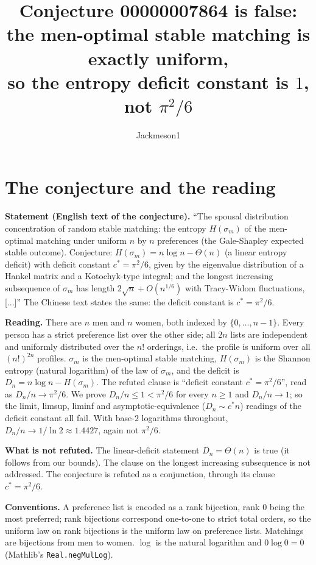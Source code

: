 \documentclass[11pt]{article}
\title{Conjecture 00000007864 is false:\\ the men-optimal stable matching is exactly uniform,\\ so the entropy deficit constant is $1$, not $\pi^2/6$}
\author{Jackmeson1}
\date{}
\theoremstyle{definition}
\begin{document}
\maketitle

\section{The conjecture and the reading}

\textbf{Statement (English text of the conjecture).} ``The spousal distribution concentration of random stable
matching: the entropy $H(\sigma_m)$ of the men-optimal matching under uniform $n$ by $n$ preferences (the
Gale-Shapley expected stable outcome). Conjecture: $H(\sigma_m) = n\log n - \Theta(n)$ (a linear entropy deficit)
with deficit constant $c^* = \pi^2/6$, given by the eigenvalue distribution of a Hankel matrix and a Kotochyk-type
integral; and the longest increasing subsequence of $\sigma_m$ has length $2\sqrt n + O(n^{1/6})$ with
Tracy-Widom fluctuations, [...]'' The Chinese text states the same: the deficit constant is $c^*=\pi^2/6$.

\textbf{Reading.} There are $n$ men and $n$ women, both indexed by $\{0,\dots,n-1\}$. Every person has a strict
preference list over the other side; all $2n$ lists are independent and uniformly distributed over the $n!$
orderings, i.e.\ the profile is uniform over all $(n!)^{2n}$ profiles. $\sigma_m$ is the men-optimal stable
matching, $H(\sigma_m)$ is the Shannon entropy (natural logarithm) of the law of $\sigma_m$, and the deficit is
$D_n = n\log n - H(\sigma_m)$. The refuted clause is ``deficit constant $c^*=\pi^2/6$'', read as
$D_n/n \to \pi^2/6$. We prove $D_n/n \le 1 < \pi^2/6$ for every $n\ge 1$ and $D_n/n\to 1$; so the limit, limsup,
liminf and asymptotic-equivalence ($D_n\sim c^* n$) readings of the deficit constant all fail. With base-$2$
logarithms throughout, $D_n/n \to 1/\ln 2\approx 1.4427$, again not $\pi^2/6$.

\textbf{What is not refuted.} The linear-deficit statement $D_n=\Theta(n)$ is true (it follows from our bounds).
The clause on the longest increasing subsequence is not addressed. The conjecture is refuted as a conjunction,
through its clause $c^*=\pi^2/6$.

\textbf{Conventions.} A preference list is encoded as a rank bijection, rank $0$ being the most preferred; rank
bijections correspond one-to-one to strict total orders, so the uniform law on rank bijections is the uniform law
on preference lists. Matchings are bijections from men to women. $\log$ is the natural logarithm and
$0\log 0=0$ (Mathlib's \texttt{Real.negMulLog}).
\end{document}

